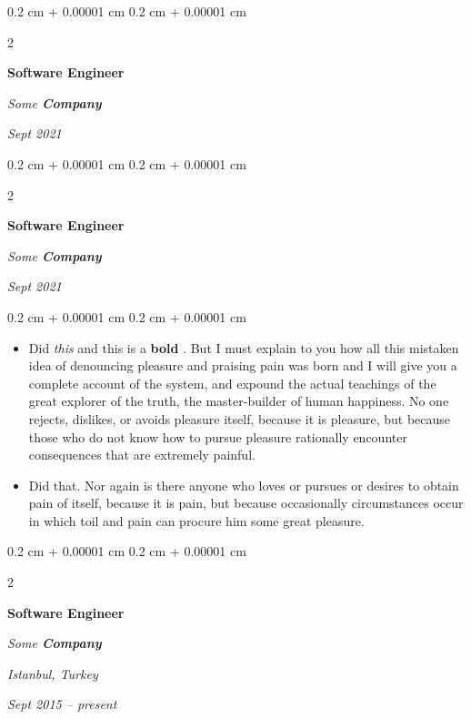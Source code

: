 \documentclass[10pt, letterpaper]{article}
\newenvironment{highlights}{
    \begin{itemize}[
        topsep=0.10 cm,
        parsep=0.10 cm,
        partopsep=0pt,
        itemsep=0pt,
        leftmargin=0.4 cm + 10pt
    ]
}{
    \end{itemize}
} %
\newenvironment{onecolentry}{
    \begin{adjustwidth}{
        0.2 cm + 0.00001 cm
    }{
        0.2 cm + 0.00001 cm
    }
}{
    \end{adjustwidth}
} %
\newenvironment{twocolentry}[2][]{
    \onecolentry
    \def\secondColumn{#2}
    \setcolumnwidth{\fill, 4.5 cm}
    \begin{paracol}{2}
}{
    \switchcolumn \raggedleft \secondColumn
    \end{paracol}
    \endonecolentry
} %
\let\hrefWithoutArrow\href
\renewcommand{\href}[2]{\hrefWithoutArrow{#1}{\ifthenelse{\equal{#2}{}}{ }{#2 }\raisebox{.15ex}{\footnotesize \faExternalLink*}}}
\begin{document}
        \vspace{0.2 cm}

        \begin{twocolentry}{
            
            
        \textit{Sept 2021}}
            \textbf{Software Engineer}
            
            \textit{Some \textbf{Company}}
        \end{twocolentry}



        \vspace{0.2 cm}

        \begin{twocolentry}{
            
            
        \textit{Sept 2021}}
            \textbf{Software Engineer}
            
            \textit{Some \textbf{Company}}
        \end{twocolentry}

        \vspace{0.10 cm}
        \begin{onecolentry}
            \begin{highlights}
                \item Did \textit{this} and this is a \textbf{bold} \href{https://example.com}{link}. But I must explain to you how all this mistaken idea of denouncing pleasure and praising pain was born and I will give you a complete account of the system, and expound the actual teachings of the great explorer of the truth, the master-builder of human happiness. No one rejects, dislikes, or avoids pleasure itself, because it is pleasure, but because those who do not know how to pursue pleasure rationally encounter consequences that are extremely painful.
                \item Did that. Nor again is there anyone who loves or pursues or desires to obtain pain of itself, because it is pain, but because occasionally circumstances occur in which toil and pain can procure him some great pleasure.
            \end{highlights}
        \end{onecolentry}


        \vspace{0.2 cm}

        \begin{twocolentry}{
        \textit{Istanbul, Turkey}    
            
        \textit{Sept 2015 – present}}
            \textbf{Software Engineer}
            
            \textit{Some \textbf{Company}}
        \end{twocolentry}
\end{document}

